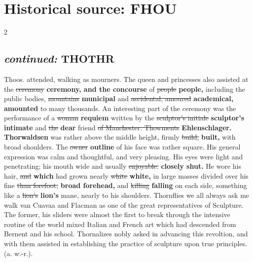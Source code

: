 \documentclass[10pt]{article}
\begin{document}
\section*{Historical source: FHOU}
\begin{multicols}{2}
\subsection*{\textit{continued:} THOTHR}
Thoos. attended, walking as mourners. The queen and princesses also assisted at the \sout{ceremony} \textbf{ceremony, and the concourse} of \sout{people} \textbf{people,} including the public bodies, \sout{mountains} \textbf{municipal} and \sout{ascidental, amoured} \textbf{academical, amounted} to many thousands. An interesting part of the ceremony was the performance of a \sout{woman} \textbf{requiem} written by the \sout{sculptor’s initiale} \textbf{sculptor's intimate} and \sout{the} \textbf{dear} friend \sout{of Manchester. Thowments} \textbf{Ehlenschlager. Thorwaldsen} was rather above the middle height, firmly \sout{build,} \textbf{built,} with broad shoulders. The \sout{owner} \textbf{outline} of his face was rather square. His general expression was calm and thoughtful, and very pleasing. His eyes were light and penetrating; his mouth wide and usually \sout{enjoyable.} \textbf{closely shut.} He wore his hair, \sout{and} \textbf{which} had grown nearly \sout{white} \textbf{white,} in large masses divided over his fine \sout{than forefoot,} \textbf{broad forehead,} and \sout{killing} \textbf{falling} on each side, something like a \sout{lion’s} \textbf{lion's} mane, nearly to his shoulders. Thornflies we all always ask me walk van Cuavaa and Flacman as one of the great representatives of Sculpture. The former, his sliders were almost the first to break through the intensive routine of the world mixed Italian and French art which had descended from Bernent and his school. Thornalizes nobly asked in advancing this revoltion, and with them assisted in establishing the practice of sculpture upon true principles. (a. w.-r.).


\end{multicols}
\end{document}
